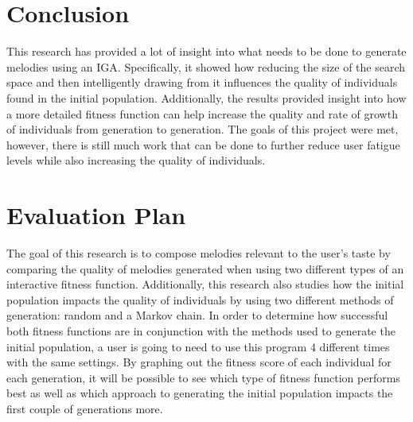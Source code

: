 \documentclass[12pt]{article} %
\begin{document}
\section{Conclusion} 
This research has provided a lot of insight into what needs to be done to generate melodies using an IGA. Specifically, it showed how reducing the size of the search space and then intelligently drawing from it influences the quality of individuals found in the initial population. Additionally, the results provided insight into how a more detailed fitness function can help increase the quality and rate of growth of individuals from generation to generation. The goals of this project were met, however, there is still much work that can be done to further reduce user fatigue levels while also increasing the quality of individuals.  \\

%
%

\section{Evaluation Plan} 
The goal of this research is to compose melodies relevant to the user's taste by comparing the quality of melodies generated when using two different types of an interactive fitness function. Additionally, this research also studies how the initial population impacts the quality of individuals by using two different methods of generation: random and a Markov chain. In order to determine how successful both fitness functions are in conjunction with the methods used to generate the initial population, a user is going to need to use this program 4 different times with the same settings. By graphing out the fitness score of each individual for each generation, it will be possible to see which type of fitness function performs best as well as which approach to generating the initial population impacts the first couple of generations more.\\
\end{document}

